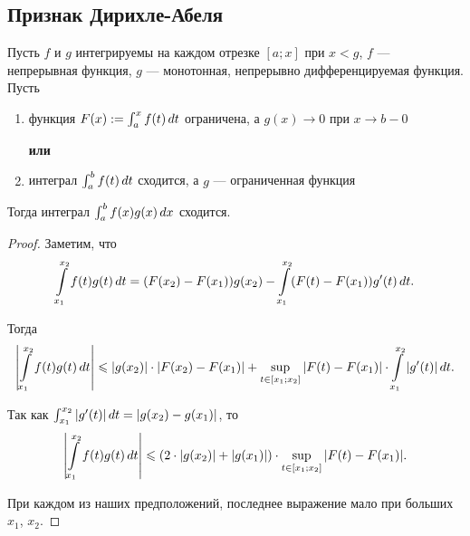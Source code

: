 \documentclass[a4paper]{article}
\theoremstyle{named}
\renewcommand{\int}{\intop}
\begin{document}
        \subsection{Признак Дирихле-Абеля}

        \begin{theorem*}
            Пусть $f$ и $g$ интегрируемы на каждом отрезке $[a; x]$ при $x < g$, $f$ --- непрерывная функция, $g$ --- монотонная, непрерывно дифференцируемая функция. Пусть
            \begin{enumerate}
            \item
                функция $F(x) := \int_a^x f(t) \dd t$ ограничена, а $g(x) \to 0$ при $x \to b - 0$

            \textbf{или}

            \item
                интеграл $\int_a^b f(t) \dd t$ сходится, а $g$ --- ограниченная функция
            \end{enumerate}

            Тогда интеграл $\int_a^b f(x)g(x) \dd x$ сходится.
        \end{theorem*}

        \begin{proof}
            Заметим, что
            \begin{equation*}
                \int_{x_1}^{x_2} f(t) g(t) \dd t = (F(x_2) - F(x_1))g(x_2) - \int_{x_1}^{x_2} (F(t) - F(x_1))g'(t) \dd t.
            \end{equation*}

            Тогда
            \begin{equation*}
                \left|\int_{x_1}^{x_2} f(t) g(t) \dd t\right| \leq |g(x_2)| \cdot |F(x_2) - F(x_1)| + \sup\limits_{t \in [x_1; x_2]} |F(t) - F(x_1)| \cdot \int_{x_1}^{x_2} |g'(t)| \dd t.
            \end{equation*}

            Так как $\int_{x_1}^{x_2} |g'(t)| \dd t = |g(x_2) - g(x_1)|$, то
            \begin{equation*}
                \left|\int_{x_1}^{x_2} f(t) g(t) \dd t\right| \leq (2 \cdot |g(x_2)| + |g(x_1)|) \cdot \sup\limits_{t \in [x_1; x_2]} |F(t) - F(x_1)|.
            \end{equation*}

            При каждом из наших предположений, последнее выражение мало при больших $x_1$, $x_2$.
        \end{proof}
        
\end{document}
